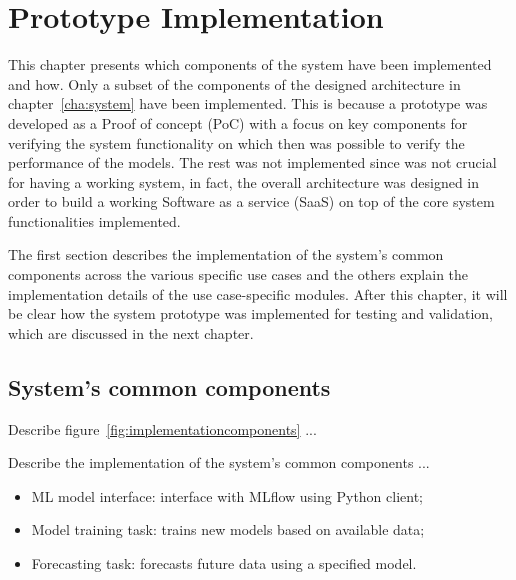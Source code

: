 \chapter{Prototype Implementation}
\label{cha:implementation}
\vspace{0.4 cm}

This chapter presents which components of the system have been implemented and how.
Only a subset of the components of the designed architecture in chapter~\ref{cha:system} have been implemented.
This is because a prototype was developed as a Proof of concept (PoC) with a focus on key components for verifying the system functionality on which then was possible to verify the performance of the models.
The rest was not implemented since was not crucial for having a working system, in fact, the overall architecture was designed in order to build a working Software as a service (SaaS) on top of the core system functionalities implemented.

The first section describes the implementation of the system's common components across the various specific use cases and the others explain the implementation details of the use case-specific modules.
After this chapter, it will be clear how the system prototype was implemented for testing and validation, which are discussed in the next chapter.


\section{System's common components}
\label{sec:componentsimpl}
\vspace{0.2 cm}

Describe figure~\ref{fig:implementationcomponents} ...

Describe the implementation of the system's common components ...
\begin{itemize}
  \item ML model interface: interface with MLflow using Python client;
  \item Model training task: trains new models based on available data;
  \item Forecasting task: forecasts future data using a specified model.
\end{itemize}

